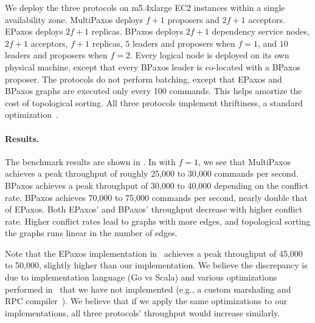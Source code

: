 We deploy the three protocols on m5.4xlarge EC2 instances within a single
availability zone. MultiPaxos deploys $f+1$ proposers and $2f+1$ acceptors.
EPaxos deploys $2f+1$ replicas. BPaxos deploys $2f+1$ dependency service nodes,
$2f+1$ acceptors, $f+1$ replicas, $5$ leaders and proposers when $f=1$, and
$10$ leaders and proposers when $f=2$. Every logical node is deployed on its
own physical machine, except that every BPaxos leader is co-located with a
BPaxos proposer. The protocols do not perform batching, except that EPaxos and
BPaxos graphs are executed only every 100 commands. This helps amortize the
cost of topological sorting. All three protocols implement thriftiness, a
standard optimization~\cite{moraru2013there}.


\paragraph{Results.}
The benchmark results are shown in . In  with
$f=1$, we see that MultiPaxos achieves a peak throughput of roughly 25,000 to
30,000 commands per second. BPaxos achieves a peak throughput of 30,000 to
40,000 depending on the conflict rate. BPaxos achieves 70,000 to 75,000
commands per second, nearly double that of EPaxos. Both EPaxos' and BPaxos'
throughput decrease with higher conflict rate. Higher conflict rates lead to
graphs with more edges, and topological sorting the graphs runs linear in the
number of edges.

Note that the EPaxos implementation in~\cite{moraru2013there} achieves a peak
throughput of 45,000 to 50,000, slightly higher than our implementation. We
believe the discrepancy is due to implementation language (Go vs Scala) and
various optimizations performed in~\cite{moraru2013there} that we have not
implemented (e.g., a custom marshaling and RPC compiler~\cite{epaxos2019blog}).
We believe that if we apply the same optimizations to our implementations, all
three protocols' throughput would increase similarly.



